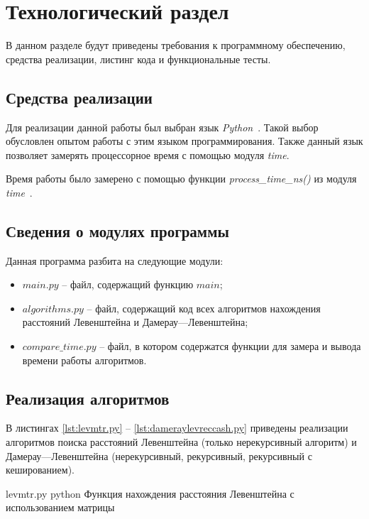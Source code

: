 \chapter{Технологический раздел}

В данном разделе будут приведены требования к программному обеспечению, средства реализации, листинг кода и функциональные тесты.

\section{Средства реализации}

Для реализации данной работы был выбран язык \textit{Python}~\cite{python}. Такой выбор обусловлен опытом работы с этим языком программирования. Также данный язык позволяет замерять процессорное время с помощью модуля \textit{time}.

Время работы было замерено с помощью функции \textit{process\_time\_ns()} из модуля \textit{time}~\cite{python-time}.

\section{Сведения о модулях программы}

Данная программа разбита на следующие модули:
\begin{itemize}
	\item $main.py$ -- файл, содержащий функцию $main$;
	\item $algorithms.py$ -- файл, содержащий код всех алгоритмов нахождения расстояний Левенштейна и Дамерау---Левенштейна;
	\item $compare\_time.py$ -- файл, в котором содержатся функции для замера и вывода времени работы алгоритмов.
\end{itemize}

\section{Реализация алгоритмов}

В листингах \ref{lst:levmtr.py} -- \ref{lst:dameraylevreccash.py} приведены реализации алгоритмов поиска расстояний Левенштейна (только нерекурсивный алгоритм) и Дамерау---Левенштейна (нерекурсивный, рекурсивный, рекурсивный с кешированием).

\clearpage

{levmtr.py} %
{python} %
{Функция нахождения расстояния Левенштейна с использованием матрицы} %

